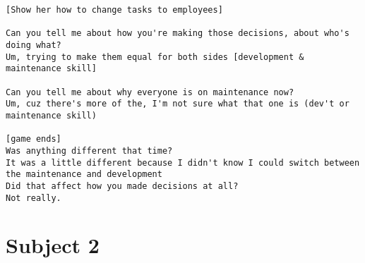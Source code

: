 \begin{lstlisting}
[Show her how to change tasks to employees]

Can you tell me about how you're making those decisions, about who's doing what?
Um, trying to make them equal for both sides [development & maintenance skill]

Can you tell me about why everyone is on maintenance now?
Um, cuz there's more of the, I'm not sure what that one is (dev't or maintenance skill)

[game ends]
Was anything different that time?
It was a little different because I didn't know I could switch between the maintenance and development
Did that affect how you made decisions at all?
Not really.
\end{lstlisting}

\clearpage\section*{Subject 2}
